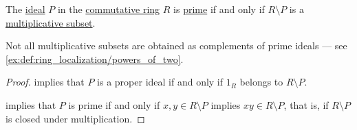 \begin{proposition}\label{thm:complement_of_prime_ideal}
  The \hyperref[def:semiring_ideal]{ideal} \( P \) in the \hyperref[def:ring/commutative]{commutative ring} \( R \) is \hyperref[def:semiring_ideal/prime]{prime} if and only if \( R \setminus P \) is a \hyperref[def:multiplicatively_closed_ring_subset]{multiplicative subset}.
\end{proposition}
\begin{comments}
  \item Not all multiplicative subsets are obtained as complements of prime ideals --- see \cref{ex:def:ring_localization/powers_of_two}.
\end{comments}
\begin{proof}
   implies that \( P \) is a proper ideal if and only if \( 1_R \) belongs to \( R \setminus P \).

   implies that \( P \) is prime if and only if \( x, y \in R \setminus P \) implies \( xy \in R \setminus P \), that is, if \( R \setminus P \) is closed under multiplication.
\end{proof}

